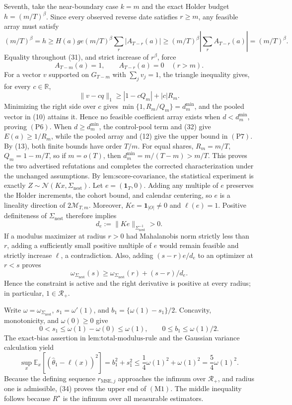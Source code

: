 Seventh, take the near-boundary case \(k=m\) and the exact Holder budget \(h=(m/T)^\beta\).  Since every observed reverse date satisfies \(r\ge m\), any feasible array must satisfy
\[
 (m/T)^\beta
 =h\ge H(a)ge(m/T)^\beta\sum_r|A_{T-r}(a)|
 \ge(m/T)^\beta\left|\sum_rA_{T-r}(a)\right|
 =(m/T)^\beta.                                                   \tag{31}
\]
Equality throughout (31), and strict increase of \(r^\beta\), force
\[
 A_{T-m}(a)=1,
 \qquad A_{T-r}(a)=0\quad(r>m).                                 \tag{32}
\]
For a vector \(v\) supported on \(G_{T-m}\) with \(\sum_jv_j=1\), the triangle inequality gives, for every \(c\in\mathbb R\),
\[
 \|v-cq\|_1
 \ge |1-cQ_m|+|c|R_m.
\]
Minimizing the right side over \(c\) gives \(\min\{1,R_m/Q_m\}=d_m^{\min}\), and the pooled vector in (10) attains it.  Hence no feasible coefficient array exists when \(d<d_m^{\min}\), proving \((\mathrm{P6})\).  When \(d\ge d_m^{\min}\), the control-pool term and (32) give \(E(a)\ge1/R_m\), while the pooled array and (12) give the upper bound in \((\mathrm{P7})\).  By (13), both finite bounds have order \(T/m\).  For equal shares, \(R_m=m/T\), \(Q_m=1-m/T\), so if \(m=o(T)\), then \(d_m^{\min}=m/(T-m)>m/T\).  This proves the two advertised refutations and completes the corrected characterization under the unchanged assumptions.
By \(\text{lem:score-covariance}\), the statistical experiment is exactly \(Z\sim\mathcal N(Kx,\Sigma_{\mathrm{nest}})\).  Let \(e=(\mathbf 1_T,0)\).  Adding any multiple of \(e\) preserves the Holder increments, the cohort bound, and calendar centering, so \(e\) is a lineality direction of \(2\mathcal M_{T,m}\).  Moreover, \(Ke=\mathbf 1_{|O|}\ne0\) and \(\ell(e)=1\).  Positive definiteness of \(\Sigma_{\mathrm{nest}}\) therefore implies
\[
 d_e:=\|Ke\|_{\Sigma_{\mathrm{nest}}^{-1}}>0.                   \tag{32}
\]
If a modulus maximizer at radius \(r>0\) had Mahalanobis norm strictly less than \(r\), adding a sufficiently small positive multiple of \(e\) would remain feasible and strictly increase \(\ell\), a contradiction.  Also, adding \((s-r)e/d_e\) to an optimizer at \(r<s\) proves
\[
 \omega_{\Sigma_{\mathrm{nest}}}(s)
 \ge\omega_{\Sigma_{\mathrm{nest}}}(r)+(s-r)/d_e.
\]
Hence the constraint is active and the right derivative is positive at every radius; in particular, \(1\in\mathcal R_+\).

Write \(\omega=\omega_{\Sigma_{\mathrm{nest}}}\), \(s_1=\omega'(1)\), and \(b_1=\{\omega(1)-s_1\}/2\).  Concavity, monotonicity, and \(\omega(0)\ge0\) give
\[
 0<s_1\le\omega(1)-\omega(0)\le\omega(1),
 \qquad 0\le b_1\le\omega(1)/2.                                \tag{33}
\]
The exact-bias assertion in \(\text{lem:total-modulus-rule}\) and the Gaussian variance calculation yield
\[
 \sup_x\mathbb E_x[(\widehat\theta_1-\ell(x))^2]
 =b_1^2+s_1^2
 \le\frac14\omega(1)^2+\omega(1)^2
 =\frac54\omega(1)^2.                                          \tag{34}
\]
Because the defining sequence \(r_{\mathrm{MSE},j}\) approaches the infimum over \(\mathcal R_+\), and radius one is admissible, (34) proves the upper end of \((\mathrm{M1})\).  The middle inequality follows because \(R^\star\) is the infimum over all measurable estimators.

